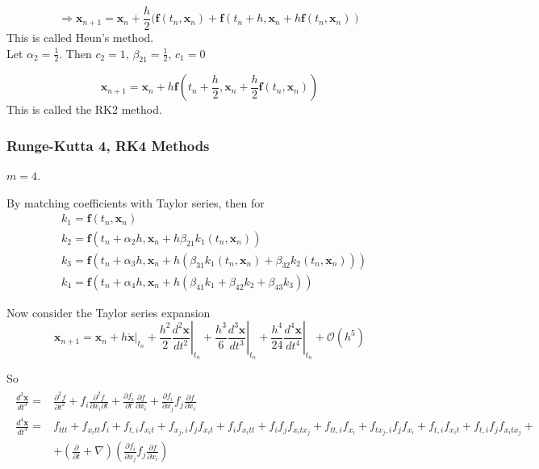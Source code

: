 \documentclass[10pt]{amsart}
\begin{document}
\begin{multicols*}{2}
\[
\Longrightarrow \mathbf{x}_{n+1} = \mathbf{x}_n + \frac{h}{2} (\mathbf{f}(t_n, \mathbf{x}_n ) + \mathbf{f}(t_n + h, \mathbf{x}_n + h\mathbf{f}(t_n, \mathbf{x}_n))
\]
This is called Heun's method. \\

Let $\alpha_2 = \frac{1}{2}$. Then $c_2 = 1, \, \beta_{21} = \frac{1}{2}, \, c_1 = 0$

\[
\mathbf{x}_{n+1} = \mathbf{x}_n + h \mathbf{f}(t_n + \frac{h}{2}, \mathbf{x}_n + \frac{h}{2} \mathbf{f}(t_n, \mathbf{x}_n))
\]
This is called the RK2 method.

\subsubsection{Runge-Kutta 4, RK4 Methods}

$m=4$.

By matching coefficients with Taylor series, then for
\begin{equation}
	\begin{aligned}
		& k_1 = \mathbf{f}(t_n, \mathbf{x}_n) \\
		& k_2 = \mathbf{f}(t_n + \alpha_2 h, \mathbf{x}_n + h \beta_{21} k_1(t_n,\mathbf{x}_n)) \\
		& k_3 = \mathbf{f}(t_n + \alpha_3 h, \mathbf{x}_n +h (\beta_{31}k_1(t_n, \mathbf{x}_n) + \beta_{32}k_2(t_n, \mathbf{x}_n)) ) \\
		& k_4 = \mathbf{f}(t_n + \alpha_4 h, \mathbf{x}_n + h(\beta_{41} k_1 + \beta_{42} k_2 + \beta_{43} k_3))
	\end{aligned}
\end{equation}

Now consider the Taylor series expansion
\[
\mathbf{x}_{n+1} = \mathbf{x}_n + h \left. \dot{ \mathbf{x}} \right|_{t_n} + \frac{h^2}{2} \left. \frac{d^2 \mathbf{x}}{ dt^2} \right|_{t_n} + \frac{h^3}{6} \left. \frac{d^3 \mathbf{x}}{ dt^3} \right|_{t_n} + \frac{h^4}{24} \left. \frac{d^4 \mathbf{x}}{ dt^4} \right|_{t_n} + \mathcal{O}(h^5)
\]

So
\[
\begin{gathered}
\begin{aligned}
\frac{d^3 \mathbf{x}}{dt^3} = & \frac{\partial^2 f}{\partial t^2} + f_i \frac{ \partial^2 f}{ \partial x_i \partial t} + \frac{ \partial f_i}{\partial t} \frac{ \partial f}{\partial x_i} + \frac{\partial f_i}{\partial x_j} f_j \frac{\partial f}{\partial x_i}  \\
\frac{d^4 \mathbf{x}}{dt^4} = & f_{ttt} + f_{x_i tt}f_i + f_{t,i} f_{x_i t} + f_{x_j, i} f_j f_{x_i t} + f_i f_{x_i tt} + f_i f_j f_{x_i t  x_j} + f_{tt, i} f_{x_i} + f_{tx_j, i} f_j f_{x_i} + f_{t,i} f_{x_i t} + f_{t,i} f_j f_{x_i t x_j} + \\
& + \left(\frac{ \partial}{\partial t} + \nabla \right)\left( \frac{ \partial f_i}{\partial x_j} f_j \frac{ \partial f}{\partial x_i} \right)
\end{aligned}
\end{gathered}
\]


\end{multicols*}
\end{document}

